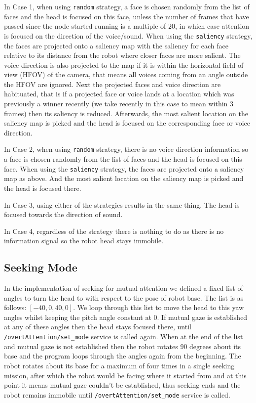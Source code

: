 \documentclass{CSSRforAfrica}
\begin{document}
In Case 1, when using \texttt{random} strategy, a face is chosen randomly from the list of faces and the head is focused on this face, unless the number of frames that have passed since the node started running is a multiple of $20$, in which case attention is focused on the direction of the voice/sound. When using the \texttt{saliency} strategy, the faces are projected onto a saliency map with the saliency for each face relative to its distance from the robot where closer faces are more salient. The voice direction is also projected to the map if it is within the horizontal field of view (HFOV) of the camera, that means all voices coming from an angle outside the HFOV are ignored. Next the projected faces and voice direction are habituated, that is if a projected face or voice lands at a location which was previously a winner recently (we take recently in this case to mean within $3$ frames) then its saliency is reduced. Afterwards, the most salient location on the saliency map is picked and the head is focused on the corresponding face or voice direction.

In Case 2, when using \texttt{random} strategy, there is no voice direction information so a face is chosen randomly from the list of faces and the head is focused on this face. When using the \texttt{saliency} strategy, the faces are projected onto a saliency map as above. And the most salient location on the saliency map is picked and the head is focused there.

In Case 3, using either of the strategies results in the same thing. The head is focused towards the direction of sound.

In Case 4, regardless of the strategy there is nothing to do as there is no information signal so the robot head stays immobile.

\subsection{Seeking Mode}
In the implementation of seeking for mutual attention we defined a fixed list of angles to turn the head to with respect to the pose of robot base. The list is as follows: $[-40, 0, 40, 0]$. We loop through this list to move the head to this yaw angles whilst keeping the pitch angle constant at $0$. If mutual gaze is established at any of these angles then the head stays focused there, until \texttt{/overtAttention/set\_mode} service is called again. When at the end of the list and mutual gaze is not established then the robot rotates $90$ degrees about its base and the program loops through the angles again from the beginning. The robot rotates about its base for a maximum of four times in a single seeking mission, after which the robot would be facing where it started from and at this point it means mutual gaze couldn't be established, thus seeking ends and the robot remains immobile until \texttt{/overtAttention/set\_mode} service is called.
\end{document}
